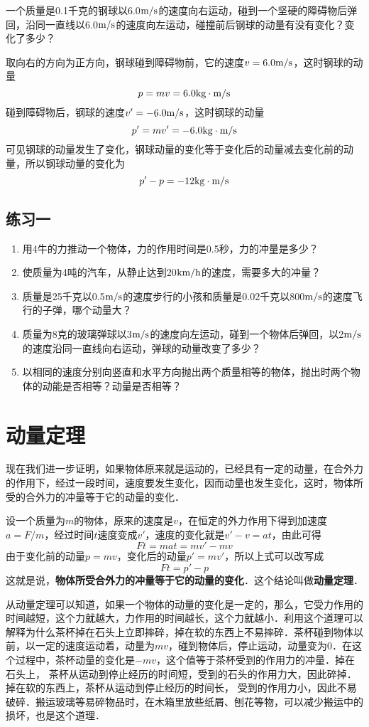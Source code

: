 \begin{example}
    一个质量是0.1千克的钢球以6.0$\text{m}/\text{s}$的速度向右运动，碰到一个坚硬的障碍物后弹回，沿同一直线以6.0$\text{m}/\text{s}$的速度向左运动，碰撞前后钢球的动量有没有变化？变化了多少？
\end{example}


\begin{solution}
    取向右的方向为正方向，钢球碰到障碍物前，它的速度$v=6.0\text{m}/\text{s}$，这时钢球的动量
\[p=mv=6.0{\rm kg}\cdot {\text{m}/\text{s}}\]
碰到障碍物后，钢球的速度$v'=-6.0\text{m}/\text{s}$，这时钢球的动量
\[p'=mv'=-6.0{\rm kg}\cdot {\text{m}/\text{s}}\]
可见钢球的动量发生了变化，钢球动量的变化等于变化后的动量减去变化前的动量，所以钢球动量的变化为
\[p'-p=-12{\rm kg}\cdot {\text{m}/\text{s}} \]
\end{solution}

\subsection*{练习一}
\begin{enumerate}
    \item 用4牛的力推动一个物体，力的作用时间是0.5秒，力的冲量是多少？
    \item 使质量为4吨的汽车，从静止达到20$\text{km}/\text{h}$的速度，需要多大的冲量？
    \item 质量是25千克以0.5$\text{m}/\text{s}$的速度步行的小孩和质量是0.02千克以800$\text{m}/\text{s}$的速度飞行的子弹，哪个动量大？
    \item 质量为8克的玻璃弹球以3$\text{m}/\text{s}$的速度向左运动，碰到一个物体后弹回，以2$\text{m}/\text{s}$的速度沿同一直线向右运动，弹球的动量改变了多少？
    \item 以相同的速度分别向竖直和水平方向抛出两个质量相等的物体，抛出时两个物体的动能是否相等？动量是否相等？
\end{enumerate}

\section{动量定理}
现在我们进一步证明，如果物体原来就是运动的，已经具有一定的动量，在合外力的作用下，经过一段时间，速度要发生变化，因而动量也发生变化，这时，物体所受的合外力的冲量等于它的动量的变化．

设一个质量为$m$的物体，原来的速度是$v$，在恒定的外力作用下得到加速度$a=F/m$，经过时间$t$速度变成$v'$，速度的变化就是$v'-v=at$，由此可得
\[Ft=mat=mv'-mv\]
由于变化前的动量$p=mv$，变化后的动量$p'=mv'$，所以上式可以改写成
\[Ft=p'-p\]
这就是说，\textbf{物体所受合外力的冲量等于它的动量的变化}．这个结论叫做\textbf{动量定理}．

从动量定理可以知道，如果一个物体的动量的变化是一定的，那么，它受力作用的时间越短，这个力就越大，力作用的时间越长，这个力就越小．利用这个道理可以解释为什么茶杯掉在石头上立即摔碎，掉在软的东西上不易摔碎．茶杯碰到物体以前，以一定的速度运动着，动量为$mv$，碰到物体后，停止运动，动量变为0．在这个过程中，茶杯动量的变化是$-mv$，这个值等于茶杯受到的作用力的冲量．掉在石头上，
茶杯从运动到停止经历的时间短，受到的石头的作用力大，因此碎掉．掉在软的东西上，茶杯从运动到停止经历的时间长，
受到的作用力小，因此不易破碎．搬运玻璃等易碎物品时，在木箱里放些纸屑、刨花等物，可以减少搬运中的损坏，也是这个道理．

